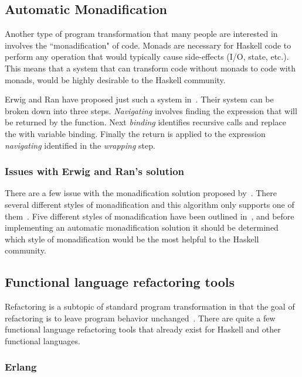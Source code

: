 \subsection{Automatic Monadification}\label{erwigMonad}

Another type of program transformation that many people are interested in involves the ``monadification" of code. Monads are necessary for Haskell code to perform any operation that would typically cause side-effects (I/O, state, etc.). This means that a system that can transform code without monads to code with monads, would be highly desirable to the Haskell community.

Erwig and Ran have proposed just such a system in~\citep{monadification}. Their system can be broken down into three steps. \textit{Navigating} involves finding the expression that will be returned by the function. Next \textit{binding} identifies recursive calls and replace the with variable binding. Finally the return is applied to the expression \textit{navigating} identified in the \textit{wrapping} step.

\subsubsection{Issues with Erwig and Ran's solution}

There are a few issue with the monadification solution proposed by~\citep{monadification}. There several different styles of monadification and this algorithm only supports one of them~\citep{clausMonadResponse}. Five different styles of monadification have been outlined in~\citep{monadSurvey}, and before implementing an automatic monadification solution it should be determined which style of monadification would be the most helpful to the Haskell community.

\subsection{Functional language refactoring tools}

Refactoring is a subtopic of standard program transformation in that the goal of refactoring is to leave program behavior unchanged~\citep{fowler}. There are quite a few functional language refactoring tools that already exist for Haskell and other functional languages. 

\subsubsection{Erlang}

